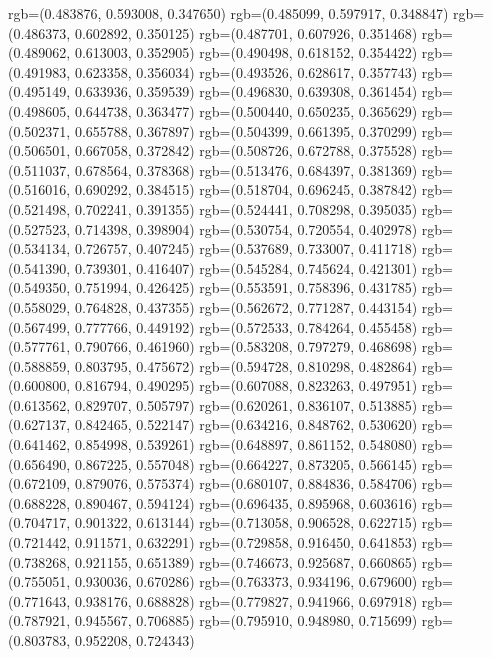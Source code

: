 {{{					rgb=(0.483876, 0.593008, 0.347650)
					rgb=(0.485099, 0.597917, 0.348847)
					rgb=(0.486373, 0.602892, 0.350125)
					rgb=(0.487701, 0.607926, 0.351468)
					rgb=(0.489062, 0.613003, 0.352905)
					rgb=(0.490498, 0.618152, 0.354422)
					rgb=(0.491983, 0.623358, 0.356034)
					rgb=(0.493526, 0.628617, 0.357743)
					rgb=(0.495149, 0.633936, 0.359539)
					rgb=(0.496830, 0.639308, 0.361454)
					rgb=(0.498605, 0.644738, 0.363477)
					rgb=(0.500440, 0.650235, 0.365629)
					rgb=(0.502371, 0.655788, 0.367897)
					rgb=(0.504399, 0.661395, 0.370299)
					rgb=(0.506501, 0.667058, 0.372842)
					rgb=(0.508726, 0.672788, 0.375528)
					rgb=(0.511037, 0.678564, 0.378368)
					rgb=(0.513476, 0.684397, 0.381369)
					rgb=(0.516016, 0.690292, 0.384515)
					rgb=(0.518704, 0.696245, 0.387842)
					rgb=(0.521498, 0.702241, 0.391355)
					rgb=(0.524441, 0.708298, 0.395035)
					rgb=(0.527523, 0.714398, 0.398904)
					rgb=(0.530754, 0.720554, 0.402978)
					rgb=(0.534134, 0.726757, 0.407245)
					rgb=(0.537689, 0.733007, 0.411718)
					rgb=(0.541390, 0.739301, 0.416407)
					rgb=(0.545284, 0.745624, 0.421301)
					rgb=(0.549350, 0.751994, 0.426425)
					rgb=(0.553591, 0.758396, 0.431785)
					rgb=(0.558029, 0.764828, 0.437355)
					rgb=(0.562672, 0.771287, 0.443154)
					rgb=(0.567499, 0.777766, 0.449192)
					rgb=(0.572533, 0.784264, 0.455458)
					rgb=(0.577761, 0.790766, 0.461960)
					rgb=(0.583208, 0.797279, 0.468698)
					rgb=(0.588859, 0.803795, 0.475672)
					rgb=(0.594728, 0.810298, 0.482864)
					rgb=(0.600800, 0.816794, 0.490295)
					rgb=(0.607088, 0.823263, 0.497951)
					rgb=(0.613562, 0.829707, 0.505797)
					rgb=(0.620261, 0.836107, 0.513885)
					rgb=(0.627137, 0.842465, 0.522147)
					rgb=(0.634216, 0.848762, 0.530620)
					rgb=(0.641462, 0.854998, 0.539261)
					rgb=(0.648897, 0.861152, 0.548080)
					rgb=(0.656490, 0.867225, 0.557048)
					rgb=(0.664227, 0.873205, 0.566145)
					rgb=(0.672109, 0.879076, 0.575374)
					rgb=(0.680107, 0.884836, 0.584706)
					rgb=(0.688228, 0.890467, 0.594124)
					rgb=(0.696435, 0.895968, 0.603616)
					rgb=(0.704717, 0.901322, 0.613144)
					rgb=(0.713058, 0.906528, 0.622715)
					rgb=(0.721442, 0.911571, 0.632291)
					rgb=(0.729858, 0.916450, 0.641853)
					rgb=(0.738268, 0.921155, 0.651389)
					rgb=(0.746673, 0.925687, 0.660865)
					rgb=(0.755051, 0.930036, 0.670286)
					rgb=(0.763373, 0.934196, 0.679600)
					rgb=(0.771643, 0.938176, 0.688828)
					rgb=(0.779827, 0.941966, 0.697918)
					rgb=(0.787921, 0.945567, 0.706885)
					rgb=(0.795910, 0.948980, 0.715699)
					rgb=(0.803783, 0.952208, 0.724343)
}}}
